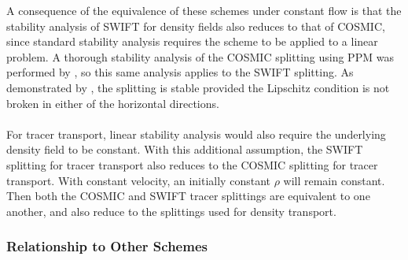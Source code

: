 \documentclass[11pt,a4paper]{article}
\begin{document}
A consequence of the equivalence of these schemes under constant flow is that the stability analysis of SWIFT for density fields also reduces to that of COSMIC, since standard stability analysis requires the scheme to be applied to a linear problem.
A thorough stability analysis of the COSMIC splitting using PPM was performed by \citet{lauritzen2007fvstab}, so this same analysis applies to the SWIFT splitting.
As demonstrated by \citet{lin1996ffsl}, the splitting is stable provided the Lipschitz condition is not broken in either of the horizontal directions. \\
\\
For tracer transport, linear stability analysis would also require the underlying density field to be constant.
With this additional assumption, the SWIFT splitting for tracer transport also reduces to the COSMIC splitting for tracer transport.
With constant velocity, an initially constant $\rho$ will remain constant.
Then both the COSMIC and SWIFT tracer splittings are equivalent to one another, and also reduce to the splittings used for density transport.

\subsubsection{Relationship to Other Schemes}
\end{document}

